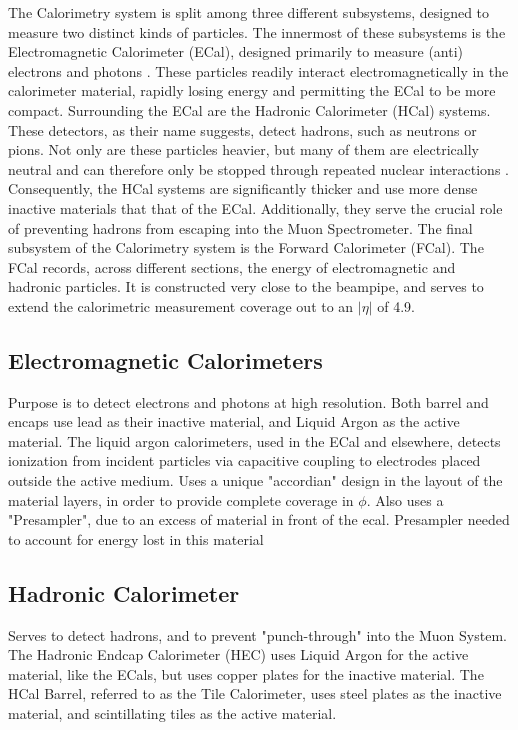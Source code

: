    The Calorimetry system is split among three different subsystems, designed to measure two distinct kinds of particles.
    The innermost of these subsystems is the Electromagnetic Calorimeter (ECal), designed primarily to measure (anti) electrons and photons \cite{calorimetry_lecture}.
    These particles readily interact electromagnetically in the calorimeter material, rapidly losing energy and permitting the ECal to be more compact.
    Surrounding the ECal are the Hadronic Calorimeter (HCal) systems.
    These detectors, as their name suggests, detect hadrons, such as neutrons or pions.
    Not only are these particles heavier, but many of them are electrically neutral and can therefore only be stopped through repeated nuclear interactions \cite{energy_measurement}.
    Consequently, the HCal systems are significantly thicker and use more dense inactive materials that that of the ECal.
    Additionally, they serve the crucial role of preventing hadrons from escaping into the Muon Spectrometer.
    The final subsystem of the Calorimetry system is the Forward Calorimeter (FCal).
    The FCal records, across different sections, the energy of electromagnetic and hadronic particles.
    It is constructed very close to the beampipe, and serves to extend the calorimetric measurement coverage out to an $|\eta|$ of 4.9.


    \subsection{Electromagnetic Calorimeters}
        Purpose is to detect electrons and photons at high resolution.
        Both barrel and encaps use lead as their inactive material, and Liquid Argon as the active material.
        The liquid argon calorimeters, used in the ECal and elsewhere, detects ionization from incident particles via capacitive coupling to electrodes placed outside the active medium.
        Uses a unique "accordian" design in the layout of the material layers, in order to provide complete coverage in $\phi$.
        Also uses a "Presampler", due to an excess of material in front of the ecal.
        Presampler needed to account for energy lost in this material


    \subsection{Hadronic Calorimeter}
        Serves to detect hadrons, and to prevent "punch-through" into the Muon System.
        The Hadronic Endcap Calorimeter (HEC) uses Liquid Argon for the active material, like the ECals, but uses copper plates for the inactive material.
        The HCal Barrel, referred to as the Tile Calorimeter, uses steel plates as the inactive material, and scintillating tiles as the active material.


